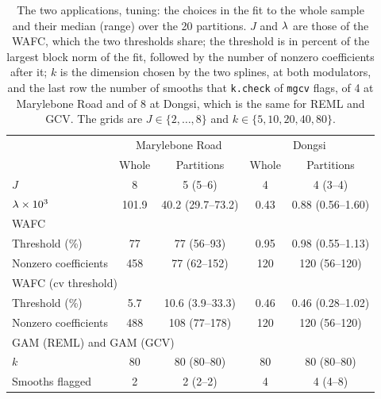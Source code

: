 \begin{table}[tp]
\color{colR1}
\caption{The two applications, tuning: the choices in the fit to the whole
sample and their median (range) over the 20 partitions. $J$ and $\lambda$ are
those of the WAFC, which the two thresholds share; the threshold is in
percent of the largest block norm of the fit, followed by the number of
nonzero coefficients after it; $k$ is the dimension chosen by the two
splines, at both modulators, and the last row the number of smooths that
\texttt{k.check} of \texttt{mgcv} flags, of 4 at Marylebone Road and of 8 at
Dongsi, which is the same for REML and GCV. The grids are
$J \in \{2,\dots,8\}$ and $k \in \{5,10,20,40,80\}$.}
\label{tab:app-tuning}
\centering
\small
\begin{tabular}{lcccc}
\hline
 & \multicolumn{2}{c}{Marylebone Road} & \multicolumn{2}{c}{Dongsi} \\
 & Whole & Partitions & Whole & Partitions \\
\hline
$J$ & 8 & 5 (5--6) & 4 & 4 (3--4) \\
$\lambda \times 10^{3}$ & 101.9 & 40.2 (29.7--73.2) & 0.43 & 0.88 (0.56--1.60) \\
\multicolumn{5}{l}{WAFC} \\
\quad Threshold (\%) & 77 & 77 (56--93) & 0.95 & 0.98 (0.55--1.13) \\
\quad Nonzero coefficients & 458 & 77 (62--152) & 120 & 120 (56--120) \\
\multicolumn{5}{l}{WAFC (cv threshold)} \\
\quad Threshold (\%) & 5.7 & 10.6 (3.9--33.3) & 0.46 & 0.46 (0.28--1.02) \\
\quad Nonzero coefficients & 488 & 108 (77--178) & 120 & 120 (56--120) \\
\multicolumn{5}{l}{GAM (REML) and GAM (GCV)} \\
\quad $k$ & 80 & 80 (80--80) & 80 & 80 (80--80) \\
\quad Smooths flagged & 2 & 2 (2--2) & 4 & 4 (4--8) \\
\hline
\end{tabular}
\end{table}
